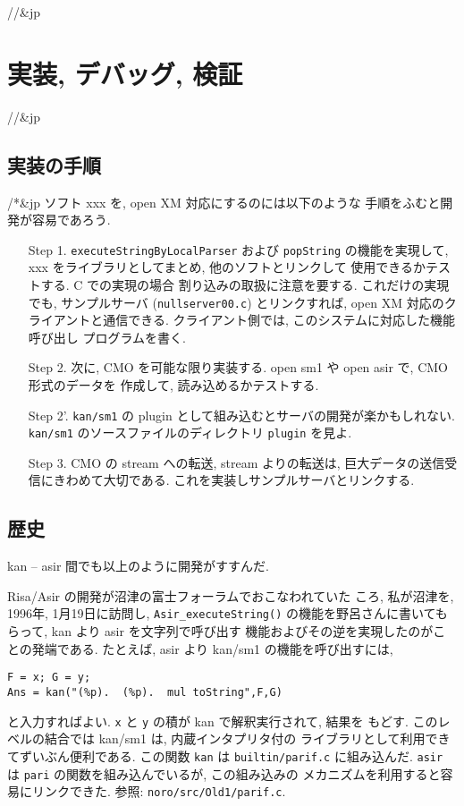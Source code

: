 //&jp \section{ 実装, デバッグ, 検証 }

//&jp \subsection{ 実装の手順 }

/*&jp
ソフト xxx を, open XM 対応にするのには以下のような
手順をふむと開発が容易であろう.
\begin{enumerate}
\item[Step 1.]
{\tt executeStringByLocalParser}
および {\tt popString} の機能を実現して,
xxx をライブラリとしてまとめ, 他のソフトとリンクして
使用できるかテストする.
C での実現の場合 割り込みの取扱に注意を要する.
これだけの実現でも, サンプルサーバ
({\tt nullserver00.c}) とリンクすれば,
open XM 対応のクライアントと通信できる.
クライアント側では, このシステムに対応した機能呼び出し
プログラムを書く.
\item[Step 2.]
次に, CMO を可能な限り実装する.
open sm1 や open asir で, CMO 形式のデータを
作成して, 読み込めるかテストする.
\item[Step 2'.]
{\tt kan/sm1} の plugin として組み込むとサーバの開発が楽かもしれない.
{\tt kan/sm1} のソースファイルのディレクトリ {\tt plugin} を見よ.
\item[Step 3.]
CMO の stream への転送, stream よりの転送は,
巨大データの送信受信にきわめて大切である.
これを実装しサンプルサーバとリンクする.
\end{enumerate}


\subsection{歴史}
kan -- asir 間でも以上のように開発がすすんだ.

Risa/Asir の開発が沼津の富士フォーラムでおこなわれていた
ころ, 私が沼津を, 1996年, 1月19日に訪問し,
{\tt Asir\_executeString()}
の機能を野呂さんに書いてもらって, kan より asir を文字列で呼び出す
機能およびその逆を実現したのがことの発端である. 
たとえば, asir より kan/sm1 の機能を呼び出すには,
\begin{verbatim}
F = x; G = y;
Ans = kan("(%p).  (%p).  mul toString",F,G)
\end{verbatim}
と入力すればよい.
{\tt x} と {\tt y} の積が kan で解釈実行されて, 結果を
もどす.
このレベルの結合では kan/sm1 は, 内蔵インタプリタ付の
ライブラリとして利用できてずいぶん便利である.
この関数 {\tt kan} は {\tt builtin/parif.c} に組み込んだ.
{\tt asir} は {\tt pari} の関数を組み込んでいるが, この組み込みの
メカニズムを利用すると容易にリンクできた.
参照: {\tt  noro/src/Old1/parif.c}.

